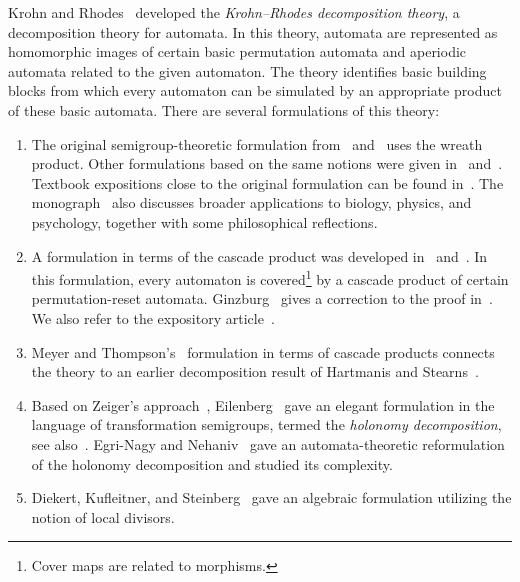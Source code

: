 Krohn and Rhodes~\cite{KrohnRhodes65} developed the \emph{Krohn--Rhodes decomposition theory}, a decomposition theory for automata.
In this theory, automata are represented as homomorphic images of certain
basic permutation automata and aperiodic automata related to the given automaton.
The theory identifies basic building blocks from which every automaton can be
simulated by an appropriate product of these basic automata.
There are several formulations of this theory:

\begin{enumerate}
	\item The original semigroup-theoretic formulation from~\cite{KrohnRhodes65}
	and~\cite[Chap.~5]{Arbib68} uses the wreath product.
	Other formulations based on the same notions were given
	in~\cite{DBLP:journals/mst/Lallement71}
	and~\cite{DBLP:journals/tcs/Esik00}.
	Textbook expositions close to the original formulation can be found
	in~\cite{rhodes2009applications,RhodesSteinberg2009qTheory}.
	The monograph~\cite{rhodes2009applications} also discusses broader
	applications to biology, physics, and psychology, together with some
	philosophical reflections.
	
	\item A formulation in terms of the cascade product was developed
	in~\cite{Ginzburg68,DBLP:journals/iandc/Zeiger67a,DBLP:journals/mst/Zeiger67}
	and~\cite[Chap.~4]{Arbib68}.
	In this formulation, every automaton is
	covered\footnote{Cover maps are related to morphisms.} by a cascade
	product of certain permutation-reset automata.
	Ginzburg~\cite{Ginzburg68} gives a correction to the proof
	in~\cite{DBLP:journals/iandc/Zeiger67a,DBLP:journals/mst/Zeiger67}.
	We also refer to the expository article~\cite{Zimmermann2020KrohnRhodesSemiautomata}.
	
	\item Meyer and Thompson's~\cite{DBLP:journals/mst/MeyerT69}
	formulation in terms of cascade products connects the theory to an
	earlier decomposition result of Hartmanis and
	Stearns~\cite{HartmanisStearns1966}.

	\item Based on Zeiger's
	approach~\cite{DBLP:journals/iandc/Zeiger67a,DBLP:journals/mst/Zeiger67},
	Eilenberg~\cite{Eilenberg1976} gave an elegant formulation in the
	language of transformation semigroups, termed the
	\emph{holonomy decomposition}, see also~\cite{Holcombe82}.
	Egri-Nagy and
	Nehaniv~\cite{doemosinehaniv05,DBLP:phd/ethos/EgriNagy05,DBLP:conf/afl/Egri-NagyMN11,DBLP:conf/wia/Egri-NagyN04,DBLP:journals/actaC/Egri-NagyN06}
	gave an automata-theoretic reformulation of the holonomy
	decomposition and studied its complexity.
	
	\item Diekert, Kufleitner, and
	Steinberg~\cite{DBLP:journals/fuin/DiekertKS12} gave an algebraic
	formulation utilizing the notion of local divisors.
\end{enumerate}

